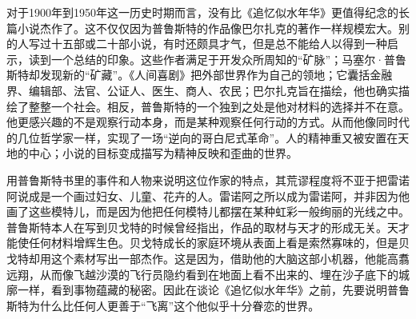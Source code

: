 \par 对于1900年到1950年这一历史时期而言，没有比《追忆似水年华》更值得纪念的长篇小说杰作了。这不仅仅因为普鲁斯特的作品像巴尔扎克的著作一样规模宏大。别的人写过十五部或二十部小说，有时还颇具才气，但是总不能给人以得到一种启示，读到一个总结的印象。这些作者满足于开发众所周知的“矿脉”；马塞尔·普鲁斯特却发现新的“矿藏”。《人间喜剧》把外部世界作为自己的领地；它囊括金融界、编辑部、法官、公证人、医生、商人、农民；巴尔扎克旨在描绘，他也确实描绘了整整一个社会。相反，普鲁斯特的一个独到之处是他对材料的选择并不在意。他更感兴趣的不是观察行动本身，而是某种观察任何行动的方式。从而他像同时代的几位哲学家一样，实现了一场“逆向的哥白尼式革命”。人的精神重又被安置在天地的中心；小说的目标变成描写为精神反映和歪曲的世界。
\par 用普鲁斯特书里的事件和人物来说明这位作家的特点，其荒谬程度将不亚于把雷诺阿说成是一个画过妇女、儿童、花卉的人。雷诺阿之所以成为雷诺阿，并非因为他画了这些模特儿，而是因为他把任何模特儿都摆在某种虹彩一般绚丽的光线之中。普鲁斯特本人在写到贝戈特的时候曾经指出，作品的取材与天才的形成无关。天才能使任何材料增辉生色。贝戈特成长的家庭环境从表面上看是索然寡味的，但是贝戈特却用这个素材写出一部杰作。这是因为，借助他的大脑这部小机器，他能高翥远翔，从而像飞越沙漠的飞行员隐约看到在地面上看不出来的、埋在沙子底下的城廓一样，看到事物蕴藏的秘密。因此在谈论《追忆似水年华》之前，先要说明普鲁斯特为什么比任何人更善于“飞离”这个他似乎十分眷恋的世界。
